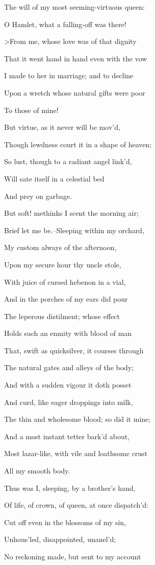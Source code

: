 \documentclass[12pt]{book}
\begin{document}
The will of my most seeming-virtuous queen:

O Hamlet, what a falling-off was there!

>From me, whose love was of that dignity

That it went hand in hand even with the vow

I made to her in marriage; and to decline

Upon a wretch whose natural gifts were poor

To those of mine!

But virtue, as it never will be mov'd,

Though lewdness court it in a shape of heaven;

So lust, though to a radiant angel link'd,

Will sate itself in a celestial bed

And prey on garbage.

But soft! methinks I scent the morning air;

Brief let me be.--Sleeping within my orchard,

My custom always of the afternoon,

Upon my secure hour thy uncle stole,

With juice of cursed hebenon in a vial,

And in the porches of my ears did pour

The leperous distilment; whose effect

Holds such an enmity with blood of man

That, swift as quicksilver, it courses through

The natural gates and alleys of the body;

And with a sudden vigour it doth posset

And curd, like eager droppings into milk,

The thin and wholesome blood; so did it mine;

And a most instant tetter bark'd about,

Most lazar-like, with vile and loathsome crust

All my smooth body.

Thus was I, sleeping, by a brother's hand,

Of life, of crown, of queen, at once dispatch'd:

Cut off even in the blossoms of my sin,

Unhous'led, disappointed, unanel'd;

No reckoning made, but sent to my account
\end{document}
